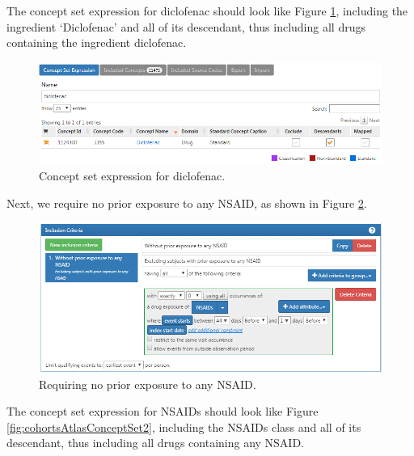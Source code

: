 \documentclass[11pt]{book}
\theoremstyle{definition}
\theoremstyle{definition}
\theoremstyle{definition}
\theoremstyle{remark}
\begin{document}
The concept set expression for diclofenac should look like Figure
\ref{fig:cohortsAtlasConceptSet1}, including the ingredient `Diclofenac'
and all of its descendant, thus including all drugs containing the
ingredient diclofenac.

\begin{figure}

{\centering \includegraphics[width=1\linewidth]{images/SuggestedAnswers/cohortsAtlasConceptSet1} 

}

\caption{Concept set expression for diclofenac.}\label{fig:cohortsAtlasConceptSet1}
\end{figure}

Next, we require no prior exposure to any NSAID, as shown in Figure
\ref{fig:cohortsAtlasInclusion1}.

\begin{figure}

{\centering \includegraphics[width=1\linewidth]{images/SuggestedAnswers/cohortsAtlasInclusion1} 

}

\caption{Requiring no prior exposure to any NSAID.}\label{fig:cohortsAtlasInclusion1}
\end{figure}

The concept set expression for NSAIDs should look like Figure
\ref{fig:cohortsAtlasConceptSet2}, including the NSAIDs class and all of
its descendant, thus including all drugs containing any NSAID.
\end{document}
